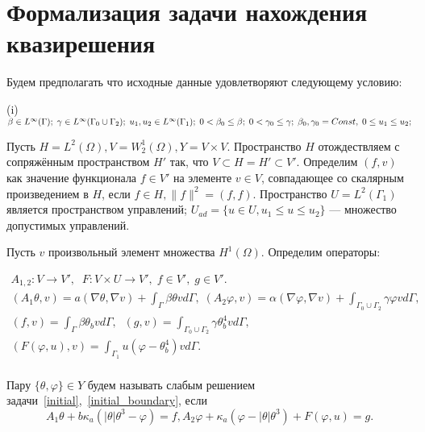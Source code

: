 \documentclass[10pt]{article}
\begin{document}
    \section{Формализация задачи нахождения квазирешения}\label{sec:formalization}

    Будем предполагать что исходные данные удовлетворяют следующему условию:


    (i) $\beta\in L^\infty(\Gamma);\; \gamma \in L^\infty(\Gamma_0\cup\Gamma_2);\;
    u_1, u_2 \in L^\infty(\Gamma_1);
    \; 0 < \beta_0 \le \beta;\;  0 < \gamma_0 \le \gamma; \;
    \beta_0,\gamma_0=Const,\;\;\\ 0 \le u_1 \le u_2;$

    Пусть $H = L^2(\Omega), V = W^1_2(\Omega), Y = V \times V $.
    Пространство $H$ отождествляем с сопряжённым пространством $H'$ так,
    что $V \subset H = H' \subset V'$.
    Определим $(f,v)$ как значение функционала $f \in V'$ на элементе $v \in V$,
    совпадающее со скалярным произведением в $H$, если $f\in H, \|f\|^2 = (f,f)$.
    Пространство $U = L^2(\Gamma_1)$ является пространством управлений;
    $U_{ad} = \{u \in U, u_1 \le u \le u_2 \}$ --- множество допустимых управлений.

    Пусть $v$ произвольный элемент множества $H^1(\Omega)$.
    Определим операторы:

    \begin{gather*}
        A_{1,2}\colon V \to V', \;\; F \colon V \times U \to V', \; f \in V', \; g \in V'.\\
        (A_1\theta,v) = a( \nabla \theta, \nabla v ) + \int_\Gamma \beta \theta v d\Gamma, \;
        (A_2 \varphi, v) = \alpha (\nabla \varphi,\nabla v)
        + \int_{\Gamma_0 \cup \Gamma_2} \gamma \varphi v d\Gamma,\\
        (f,v) = \int_\Gamma \beta \theta_b v d\Gamma, \; \;
        (g,v) = \int_{\Gamma_0 \cup \Gamma_2} \gamma \theta_b^4 v d\Gamma,\\
        (F(\varphi, u), v) = \int_{\Gamma_1} u (\varphi - \theta^4_b)v d\Gamma.\\
    \end{gather*}

    Пару $\{\theta, \varphi \} \in Y$ будем называть слабым решением
    задачи~\eqref{initial},~\eqref{initial_boundary}, если
    \begin{equation}
        \label{weak_operational}
        A_1 \theta + b \kappa_a (| \theta | \theta^3 - \varphi ) = f,
        A_2 \varphi + \kappa_a (\varphi - |\theta|\theta^3) + F(\varphi, u) = g.
    \end{equation}
\end{document}
